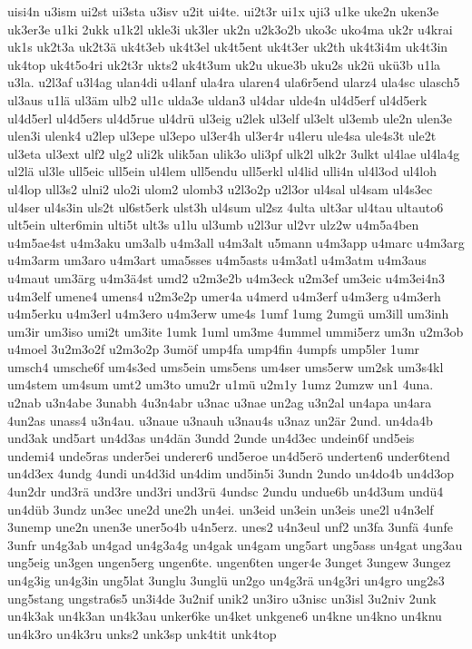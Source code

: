 {uisi4n
u3ism
ui2st
ui3sta
u3isv
u2it
ui4te.
ui2t3r
ui1x
uji3
u1ke
uke2n
uken3e
uk3er3e
u1ki
2ukk
u1k2l
ukle3i
uk3ler
uk2n
u2k3o2b
uko3c
uko4ma
uk2r
u4krai
uk1s
uk2t3a
uk2t3ä
uk4t3eb
uk4t3el
uk4t5ent
uk4t3er
uk2th
uk4t3i4m
uk4t3in
uk4top
uk4t5o4ri
uk2t3r
ukts2
uk4t3um
uk2u
ukue3b
uku2s
uk2ü
ukü3b
u1la
u3la.
u2l3af
u3l4ag
ulan4di
u4lanf
ula4ra
ularen4
ula6r5end
ularz4
ula4sc
ulasch5
ul3aus
u1lä
ul3äm
ulb2
ul1c
ulda3e
uldan3
ul4dar
ulde4n
ul4d5erf
ul4d5erk
ul4d5erl
ul4d5ers
ul4d5rue
ul4drü
ul3eig
u2lek
ul3elf
ul3elt
ul3emb
ule2n
ulen3e
ulen3i
ulenk4
u2lep
ul3epe
ul3epo
ul3er4h
ul3er4r
u4leru
ule4sa
ule4s3t
ule2t
ul3eta
ul3ext
ulf2
ulg2
uli2k
ulik5an
ulik3o
uli3pf
ulk2l
ulk2r
3ulkt
ul4lae
ul4la4g
ul2lä
ul3le
ull5eic
ull5ein
ul4lem
ull5endu
ull5erkl
ul4lid
ulli4n
ul4l3od
ul4loh
ul4lop
ull3s2
ulni2
ulo2i
ulom2
ulomb3
u2l3o2p
u2l3or
ul4sal
ul4sam
ul4s3ec
ul4ser
ul4s3in
uls2t
ul6st5erk
ulst3h
ul4sum
ul2sz
4ulta
ult3ar
ul4tau
ultauto6
ult5ein
ulter6min
ulti5t
ult3s
u1lu
ul3umb
u2l3ur
ul2vr
ulz2w
u4m5a4ben
u4m5ae4st
u4m3aku
um3alb
u4m3all
u4m3alt
u5mann
u4m3app
u4marc
u4m3arg
u4m3arm
um3aro
u4m3art
uma5sses
u4m5asts
u4m3atl
u4m3atm
u4m3aus
u4maut
um3ärg
u4m3ä4st
umd2
u2m3e2b
u4m3eck
u2m3ef
um3eic
u4m3ei4n3
u4m3elf
umene4
umens4
u2m3e2p
umer4a
u4merd
u4m3erf
u4m3erg
u4m3erh
u4m5erku
u4m3erl
u4m3ero
u4m3erw
ume4s
1umf
1umg
2umgü
um3ill
um3inh
um3ir
um3iso
umi2t
um3ite
1umk
1uml
um3me
4ummel
ummi5erz
um3n
u2m3ob
u4moel
3u2m3o2f
u2m3o2p
3umöf
ump4fa
ump4fin
4umpfs
ump5ler
1umr
umsch4
umsche6f
um4s3ed
ums5ein
ums5ens
um4ser
ums5erw
um2sk
um3s4kl
um4stem
um4sum
umt2
um3to
umu2r
u1mü
u2m1y
1umz
2umzw
un1
4una.
u2nab
u3n4abe
3unabh
4u3n4abr
u3nac
u3nae
un2ag
u3n2al
un4apa
un4ara
4un2as
unass4
u3n4au.
u3naue
u3nauh
u3nau4s
u3naz
un2är
2und.
un4da4b
und3ak
und5art
un4d3as
un4dän
3undd
2unde
un4d3ec
undein6f
und5eis
undemi4
unde5ras
under5ei
underer6
und5eroe
un4d5erö
underten6
under6tend
un4d3ex
4undg
4undi
un4d3id
un4dim
und5in5i
3undn
2undo
un4do4b
un4d3op
4un2dr
und3rä
und3re
und3ri
und3rü
4undsc
2undu
undue6b
un4d3um
undü4
un4düb
3undz
un3ec
une2d
une2h
un4ei.
un3eid
un3ein
un3eis
une2l
u4n3elf
3unemp
une2n
unen3e
uner5o4b
u4n5erz.
unes2
u4n3eul
unf2
un3fa
3unfä
4unfe
3unfr
un4g3ab
un4gad
un4g3a4g
un4gak
un4gam
ung5art
ung5ass
un4gat
ung3au
ung5eig
un3gen
ungen5erg
ungen6te.
ungen6ten
unger4e
3unget
3ungew
3ungez
un4g3ig
un4g3in
ung5lat
3unglu
3unglü
un2go
un4g3rä
un4g3ri
un4gro
ung2s3
ung5stang
ungstra6s5
un3i4de
3u2nif
unik2
un3iro
u3nisc
un3isl
3u2niv
2unk
un4k3ak
un4k3an
un4k3au
unker6ke
un4ket
unkgene6
un4kne
un4kno
un4knu
un4k3ro
un4k3ru
unks2
unk3sp
unk4tit
unk4top
}

